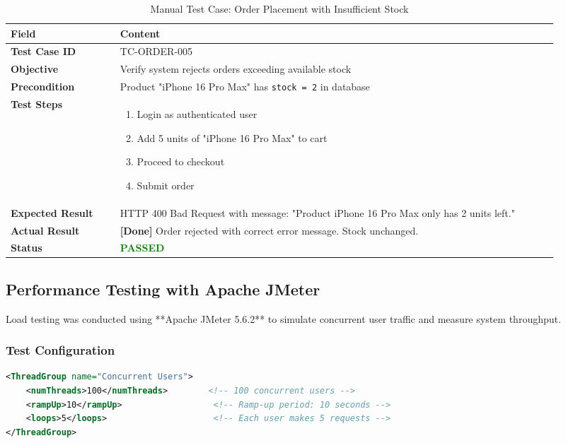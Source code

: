 \documentclass[12pt, a4paper]{report}
\begin{document}
{{\begin{table}[H]
\centering
\caption{Manual Test Case: Order Placement with Insufficient Stock}
\label{tab:test_stock}
\small
\begin{tabular}{@{}p{0.18\linewidth}p{0.72\linewidth}@{}}
\toprule
\textbf{Field} & \textbf{Content} \\
\midrule
\textbf{Test Case ID} & TC-ORDER-005 \\
\textbf{Objective} & Verify system rejects orders exceeding available stock \\
\textbf{Precondition} & Product "iPhone 16 Pro Max" has \texttt{stock = 2} in database \\
\textbf{Test Steps} & 
\begin{minipage}[t]{\linewidth}
\begin{enumerate}[nosep,leftmargin=*]
    \item Login as authenticated user
    \item Add 5 units of "iPhone 16 Pro Max" to cart
    \item Proceed to checkout
    \item Submit order
\end{enumerate}
\end{minipage} \\
\textbf{Expected Result} & HTTP 400 Bad Request with message: "Product iPhone 16 Pro Max only has 2 units left." \\
\textbf{Actual Result} & \textbf{[Done]} Order rejected with correct error message. Stock unchanged. \\
\textbf{Status} & \textcolor{green}{\textbf{PASSED}} \\
\bottomrule
\end{tabular}
\end{table}

\subsection{Performance Testing with Apache JMeter}

Load testing was conducted using **Apache JMeter 5.6.2** to simulate concurrent user traffic and measure system throughput.

\subsubsection{Test Configuration}

\begin{lstlisting}[language=XML, caption=JMeter Test Plan Configuration]
<ThreadGroup name="Concurrent Users">
    <numThreads>100</numThreads>        <!-- 100 concurrent users -->
    <rampUp>10</rampUp>                  <!-- Ramp-up period: 10 seconds -->
    <loops>5</loops>                     <!-- Each user makes 5 requests -->
</ThreadGroup>


\end{lstlisting}}}
\end{document}
